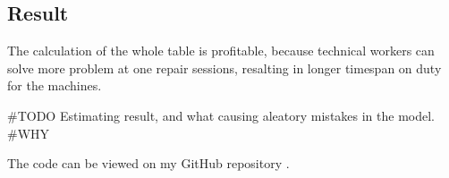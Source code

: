 	\subsection{Result}
The calculation of the whole table is profitable, because technical workers can solve more problem at one repair sessions, resalting in longer timespan on duty for the machines.

\#TODO Estimating result, and what causing aleatory mistakes in the model. 
\#WHY

The code can be viewed on my GitHub repository \cite{GitHub_FP_RUL}.